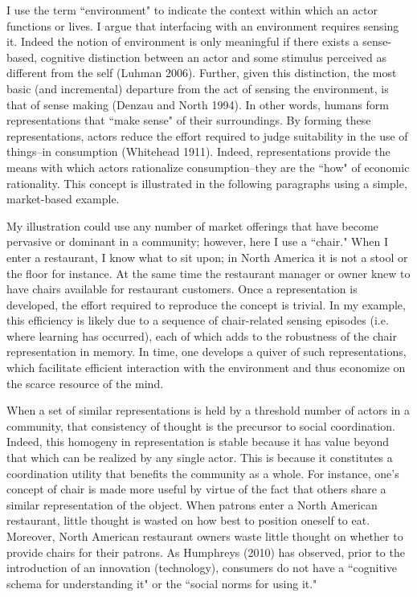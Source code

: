 I use the term ``environment" to indicate the context within which an actor functions or lives. I argue that interfacing with an environment requires sensing it. Indeed the notion of environment is only meaningful if there exists a sense-based, cognitive distinction between an actor and some stimulus perceived as different from the self (Luhman 2006). Further, given this distinction, the most basic (and incremental) departure from the act of sensing the environment, is that of sense making (Denzau and North 1994). In other words, humans form representations that ``make sense" of their surroundings. By forming  these representations, actors reduce the effort required to judge suitability in the use of things--in consumption (Whitehead 1911). Indeed, representations provide the means with which actors rationalize consumption--they are the ``how" of economic rationality. This concept is illustrated in the following paragraphs using a simple, market-based example. 

My illustration could use any number of market offerings that have become pervasive or dominant in a community; however, here I use a ``chair." When I enter a restaurant, I know what to sit upon; in North America it is not a stool or the floor for instance. At the same time the restaurant manager or owner knew to have chairs available for restaurant customers. Once a representation is developed, the effort required to reproduce the concept is trivial. In my example, this efficiency is likely due to a sequence of chair-related sensing episodes (i.e. where learning has occurred), each of which adds to the robustness of the chair representation in memory. In time, one develops a quiver of such representations, which facilitate efficient interaction with the environment  and thus economize on the scarce resource of the mind. 

When a set of similar representations is held by a threshold number of actors in a community, that consistency of thought is the precursor to social coordination. Indeed, this homogeny in representation is stable because it has value beyond that which can be realized by any single actor. This is because it constitutes a coordination utility that benefits the community as a whole. For instance, one's concept of chair is made more useful by virtue of the fact that others share a similar representation of the object. When patrons enter a North American restaurant, little thought is wasted on how best to position oneself to eat. Moreover, North American restaurant owners waste little thought on whether to provide chairs for their patrons. As Humphreys (2010) has observed, prior to the introduction of an innovation (technology), consumers do not have a ``cognitive schema for understanding it" or the ``social norms for using it." 

